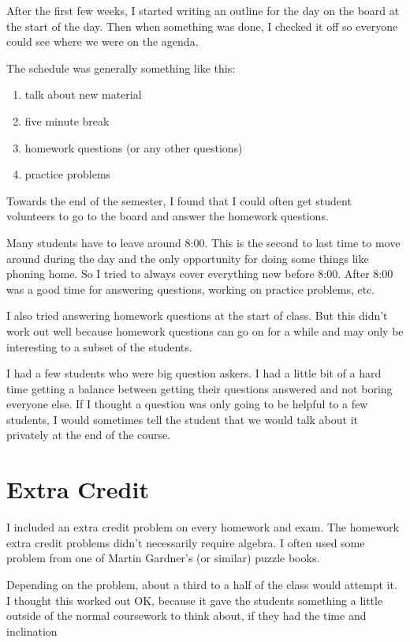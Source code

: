 \documentclass{article}
\begin{document}
After the first few weeks, I started writing an outline for the day on the board at the start of the day.  Then when
something was done, I checked it off so everyone could see where we were on the agenda.

The schedule was generally something like this:
\begin{enumerate}
  \item talk about new material
  \item five minute break
  \item homework questions (or any other questions)
  \item practice problems
\end{enumerate}

Towards the end of the semester, I found that I could often get student volunteers to go to the board and answer the
homework questions.

Many students have to leave around 8:00.  This is the second to last time to move around during the day and the only
opportunity for doing some things like phoning home.  So I tried to always cover everything new before 8:00.  After 8:00
was a good time for answering questions, working on practice problems, etc.
 
I also tried answering homework questions at the
start of class.  But this didn't work out well because homework questions can go on for a while and may only be
interesting to a subset of the students.

I had a few students who were big question askers.  I had a little bit of a hard time getting a balance between getting
their questions answered and not boring everyone else.  If I thought a question was only going to be helpful to a few
students, I would sometimes tell the student that we would talk about it privately at the end of the course.

\section{Extra Credit}

I included an extra credit problem on every homework and exam.  The homework extra credit problems didn't 
necessarily require algebra.  I often used some problem from one of Martin Gardner's (or similar) puzzle books.

Depending on the problem, about a third to a half of the class would attempt it.  I thought this worked out OK, because
it gave the students something a little outside of the normal coursework to think about, if they had the time and inclination
\end{document}

